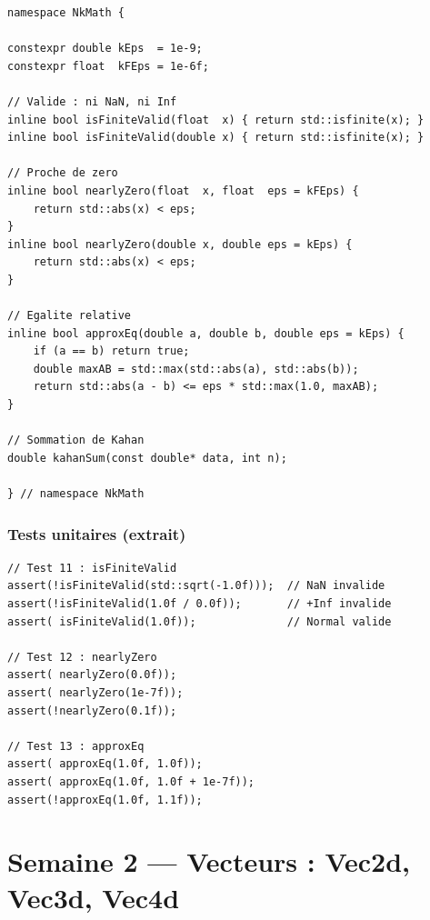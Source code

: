 \documentclass[12pt,a4paper]{report}
\begin{document}
\begin{lstlisting}[caption={Float.h --- fonctions utilitaires}]
namespace NkMath {

constexpr double kEps  = 1e-9;
constexpr float  kFEps = 1e-6f;

// Valide : ni NaN, ni Inf
inline bool isFiniteValid(float  x) { return std::isfinite(x); }
inline bool isFiniteValid(double x) { return std::isfinite(x); }

// Proche de zero
inline bool nearlyZero(float  x, float  eps = kFEps) {
    return std::abs(x) < eps;
}
inline bool nearlyZero(double x, double eps = kEps) {
    return std::abs(x) < eps;
}

// Egalite relative
inline bool approxEq(double a, double b, double eps = kEps) {
    if (a == b) return true;
    double maxAB = std::max(std::abs(a), std::abs(b));
    return std::abs(a - b) <= eps * std::max(1.0, maxAB);
}

// Sommation de Kahan
double kahanSum(const double* data, int n);

} // namespace NkMath
\end{lstlisting}

\subsection{Tests unitaires (extrait)}

\begin{lstlisting}[caption={Tests Float.h}]
// Test 11 : isFiniteValid
assert(!isFiniteValid(std::sqrt(-1.0f)));  // NaN invalide
assert(!isFiniteValid(1.0f / 0.0f));       // +Inf invalide
assert( isFiniteValid(1.0f));              // Normal valide

// Test 12 : nearlyZero
assert( nearlyZero(0.0f));
assert( nearlyZero(1e-7f));
assert(!nearlyZero(0.1f));

// Test 13 : approxEq
assert( approxEq(1.0f, 1.0f));
assert( approxEq(1.0f, 1.0f + 1e-7f));
assert(!approxEq(1.0f, 1.1f));
\end{lstlisting}

\newpage

\chapter*{Semaine 2 --- Vecteurs : Vec2d, Vec3d, Vec4d}
\end{document}
